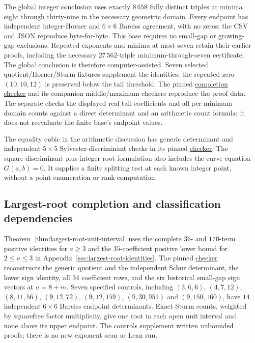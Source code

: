 The global integer conclusion uses exactly $8\,658$ fully distinct
triples at minima eight through thirty-nine in the necessary geometric
domain. Every endpoint has independent integer-Horner and $6\times6$
Bareiss agreement, with no zeros; the CSV and JSON reproduce byte-for-byte.
This base requires no small-gap or growing-gap exclusions. Repeated
exponents and minima at most seven retain their earlier proofs, including
the necessary $27\,562$-triple minimum-through-seven certificate.
The global conclusion is therefore computer-assisted. Seven selected
quotient/Horner/Sturm fixtures supplement the identities; the repeated
zero $(10,10,12)$ is preserved below the tail threshold.
The pinned
\href{https://github.com/the-omega-institute/ideal-intersection-laplacian/blob/4afe151e1dc7193e6776cc1b08d3606aa804238e/scripts/check_endpoint_two_completion.py}{completion checker}
and its companion middle/maximum checkers reproduce the proof data.
The separate  checks
the displayed real-tail coefficients and all per-minimum domain counts
against a direct determinant and an arithmetic count formula; it does not
reevaluate the finite base's endpoint values.

The equality cubic in the arithmetic discussion has generic determinant and
independent $5\times5$ Sylvester-discriminant checks in its pinned
\href{https://github.com/the-omega-institute/ideal-intersection-laplacian/blob/4afe151e1dc7193e6776cc1b08d3606aa804238e/scripts/check_endpoint_one_equality_cubic.py}{checker}.
The square-discriminant-plus-integer-root formulation also includes the
curve equation $G(a,b)=0$. It supplies a finite splitting test at each
known integer point, without a point enumeration or rank computation.

\subsection{Largest-root completion and classification dependencies}

Theorem~\ref{thm:largest-root-unit-interval} uses the complete $36$- and
$170$-term positive identities for $a\geq3$ and the $35$-coefficient
positive lower bound for $2\leq a\leq3$ in
Appendix~\ref{sec:largest-root-identities}.
The pinned
\href{https://github.com/the-omega-institute/ideal-intersection-laplacian/blob/4471a5b4a02d97d3dcf78ea004298d5592924a95/scripts/check_largest_root_unit_interval.py}{checker}
reconstructs the generic quotient and the independent Schur determinant,
the lower sign identity, all $34$ coefficient rows, and the six historical
small-gap sign vectors at $a=8+m$. Seven specified controls, including
$(3,6,6)$, $(4,7,12)$, $(8,11,56)$, $(9,12,72)$, $(9,12,159)$,
$(9,30,951)$ and $(9,150,160)$, have $14$ independent $6\times6$
Bareiss endpoint determinants. Exact Sturm counts, weighted by squarefree
factor multiplicity, give one root in each open unit interval and none
above its upper endpoint. The controls supplement written unbounded proofs;
there is no new exponent scan or Lean run.

